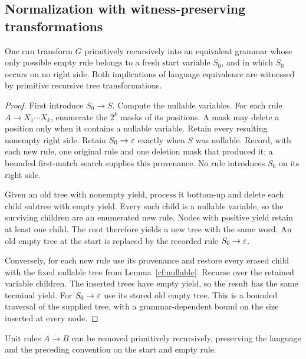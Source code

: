 \subsection{Normalization with witness-preserving transformations}

\begin{theorem}
\label{cf:epsilon-removal}
One can transform $G$ primitively recursively into an equivalent grammar
whose only possible empty rule belongs to a fresh start variable $S_0$, and
in which $S_0$ occurs on no right side.  Both implications of language
equivalence are witnessed by primitive recursive tree transformations.
\end{theorem}

\begin{proof}
First introduce $S_0\to S$.  Compute the nullable variables.  For each rule
$A\to X_1\cdots X_k$, enumerate the $2^k$ masks of its positions.  A mask may
delete a position only when it contains a nullable variable.  Retain every
resulting nonempty right side.  Retain $S_0\to\varepsilon$ exactly when $S$ was
nullable.  Record, with each new rule, one original rule and one deletion
mask that produced it; a bounded first-match search supplies this provenance.
No rule introduces $S_0$ on its right side.

Given an old tree with nonempty yield, process it bottom-up and delete each
child subtree with empty yield.  Every such child is a nullable variable,
so the surviving children are an enumerated new rule.  Nodes with positive
yield retain at least one child.  The root therefore yields a new tree with
the same word.  An old empty tree at the start is replaced by the recorded
rule $S_0\to\varepsilon$.

Conversely, for each new rule use its provenance and restore every erased
child with the fixed nullable tree from Lemma~\ref{cf:nullable}.  Recurse
over the retained variable children.  The inserted trees have empty yield,
so the result has the same terminal yield.  For $S_0\to\varepsilon$ use its stored
old empty tree.  This is a bounded traversal of the supplied tree, with a
grammar-dependent bound on the size inserted at every node.
\end{proof}

\begin{theorem}
\label{cf:unit-removal}
Unit rules $A\to B$ can be removed primitively recursively, preserving
the language and the preceding convention on the start and empty rule.
\end{theorem}

